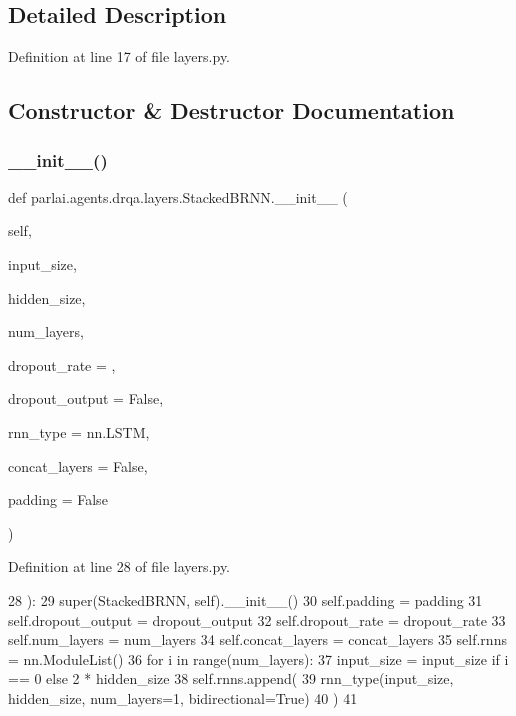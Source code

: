 \subsection{Detailed Description}


Definition at line 17 of file layers.\+py.



\subsection{Constructor \& Destructor Documentation}
\mbox{\label{classparlai_1_1agents_1_1drqa_1_1layers_1_1StackedBRNN_ac2e446b2811a6a62ce19f5bb511f6a74}} 
\subsubsection{\texorpdfstring{\+\_\+\+\_\+init\+\_\+\+\_\+()}{\_\_init\_\_()}}
{\footnotesize\ttfamily def parlai.\+agents.\+drqa.\+layers.\+Stacked\+B\+R\+N\+N.\+\_\+\+\_\+init\+\_\+\+\_\+ (\begin{DoxyParamCaption}\item[{}]{self,  }\item[{}]{input\+\_\+size,  }\item[{}]{hidden\+\_\+size,  }\item[{}]{num\+\_\+layers,  }\item[{}]{dropout\+\_\+rate = {},  }\item[{}]{dropout\+\_\+output = {\ttfamily False},  }\item[{}]{rnn\+\_\+type = {\ttfamily nn.LSTM},  }\item[{}]{concat\+\_\+layers = {\ttfamily False},  }\item[{}]{padding = {\ttfamily False} }\end{DoxyParamCaption})}



Definition at line 28 of file layers.\+py.


\begin{DoxyCode}
28     ):
29         super(StackedBRNN, self).\_\_init\_\_()
30         self.padding = padding
31         self.dropout\_output = dropout\_output
32         self.dropout\_rate = dropout\_rate
33         self.num\_layers = num\_layers
34         self.concat\_layers = concat\_layers
35         self.rnns = nn.ModuleList()
36         \textcolor{keywordflow}{for} i \textcolor{keywordflow}{in} range(num\_layers):
37             input\_size = input\_size \textcolor{keywordflow}{if} i == 0 \textcolor{keywordflow}{else} 2 * hidden\_size
38             self.rnns.append(
39                 rnn\_type(input\_size, hidden\_size, num\_layers=1, bidirectional=\textcolor{keyword}{True})
40             )
41 
\end{DoxyCode}


